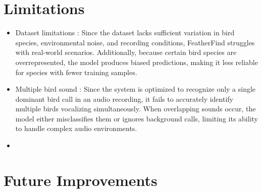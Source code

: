 \section{Limitations}
\begin{itemize}
      \item Dataset limitations : Since the dataset lacks sufficient variation in bird species, 
      environmental noise, and recording conditions, FeatherFind struggles with real-world scenarios. 
      Additionally, because certain bird species are overrepresented, the model produces biased predictions, 
      making it less reliable for species with fewer training samples.
      \item Multiple bird sound : Since the system is optimized to recognize only a single dominant bird call in an audio recording, 
      it fails to accurately identify multiple birds vocalizing simultaneously. When overlapping sounds occur, the model either 
      misclassifies them or ignores background calls, limiting its ability to handle complex audio environments.
      \item
\end{itemize}
  
\section{Future Improvements}

\renewcommand\bibname{REFERENCES} %




